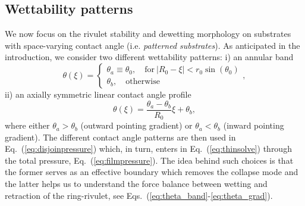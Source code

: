 \documentclass[twoside,twocolumn,9pt]{article}
\begin{document}
\subsection{Wettability patterns}\label{subsec:wettability}
We now focus on the rivulet stability and dewetting morphology on 
substrates with space-varying contact angle (i.e. {\it patterned substrates}).
As anticipated in the introduction, we consider two different wettability patterns: i) an annular band 
\begin{equation}\label{eq:theta_band}
    \theta(\xi) =\begin{cases}
        \theta_a \equiv \theta_0,\quad \text{for}~|R_0-\xi| < r_0\sin(\theta_0) \\
        \theta_b,\quad \text{otherwise}
    \end{cases},
\end{equation}
ii) an axially symmetric linear contact angle profile
\begin{equation}\label{eq:theta_grad}
    \theta(\xi) = \frac{\theta_{a}-\theta_{b}}{R_0} \xi + \theta_{b},
\end{equation}
where either $\theta_{a} > \theta_{b}$ (outward pointing gradient) or $\theta_a < \theta_b$ (inward pointing
 gradient).
The different contact angle patterns are then used in Eq.~(\ref{eq:disjoinpressure}) which, in turn, enters in Eq.~(\ref{eq:thinsolve}) through the total pressure, Eq.~(\ref{eq:filmpressure}).
The idea behind such choices is that the former serves as an effective boundary which removes the collapse mode and the latter helps us to understand the force balance between wetting and retraction of the ring-rivulet, see Eqs.~(\ref{eq:theta_band}-\ref{eq:theta_grad}).
\end{document}
